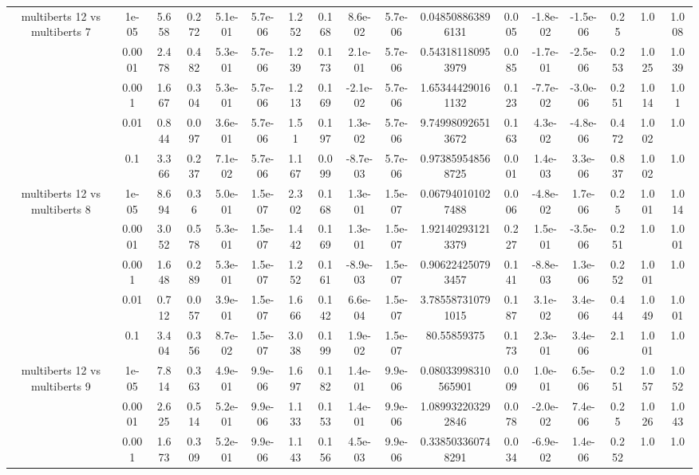 \begin{tabular}{|c|c|c|c|c|c|c|c|c|c|c|c|c|c|c|c|c|}
\hline
\multirow{5}{*}{multiberts 12 vs multiberts 7} & 1e-05 & 5.658 & 0.272 & 5.1e-01 & 5.7e-06 & 1.252 & 0.168 & 8.6e-02 & 5.7e-06 & 0.048508863896131 & 0.005 & -1.8e-02 & -1.5e-06 & 0.25 & 1.0 & 1.008 \\
 & 0.0001 & 2.478 & 0.482 & 5.3e-01 & 5.7e-06 & 1.239 & 0.173 & 2.1e-01 & 5.7e-06 & 0.543181180953979 & 0.085 & -1.7e-01 & -2.5e-06 & 0.253 & 1.025 & 1.039 \\
 & 0.001 & 1.667 & 0.304 & 5.3e-01 & 5.7e-06 & 1.213 & 0.169 & -2.1e-02 & 5.7e-06 & 1.653444290161132 & 0.123 & -7.7e-02 & -3.0e-06 & 0.251 & 1.014 & 1.01 \\
 & 0.01 & 0.844 & 0.097 & 3.6e-01 & 5.7e-06 & 1.51 & 0.197 & 1.3e-02 & 5.7e-06 & 9.749980926513672 & 0.163 & 4.3e-02 & -4.8e-06 & 0.472 & 1.002 & 1.0 \\
 & 0.1 & 3.366 & 0.237 & 7.1e-02 & 5.7e-06 & 1.167 & 0.099 & -8.7e-03 & 5.7e-06 & 0.973859548568725 & 0.001 & 1.4e-03 & 3.3e-06 & 0.837 & 1.002 & 1.0 \\
\hline
\multirow{5}{*}{multiberts 12 vs multiberts 8} & 1e-05 & 8.694 & 0.36 & 5.0e-01 & 1.5e-07 & 2.302 & 0.168 & 1.3e-01 & 1.5e-07 & 0.067940101027488 & 0.006 & -4.8e-02 & 1.7e-06 & 0.25 & 1.001 & 1.014 \\
 & 0.0001 & 3.052 & 0.578 & 5.3e-01 & 1.5e-07 & 1.442 & 0.169 & 1.3e-01 & 1.5e-07 & 1.921402931213379 & 0.227 & 1.5e-01 & -3.5e-06 & 0.251 & 1.0 & 1.001 \\
 & 0.001 & 1.648 & 0.289 & 5.3e-01 & 1.5e-07 & 1.252 & 0.161 & -8.9e-03 & 1.5e-07 & 0.906224250793457 & 0.141 & -8.8e-03 & 1.3e-06 & 0.252 & 1.001 & 1.0 \\
 & 0.01 & 0.712 & 0.057 & 3.9e-01 & 1.5e-07 & 1.666 & 0.142 & 6.6e-04 & 1.5e-07 & 3.785587310791015 & 0.187 & 3.1e-02 & 3.4e-06 & 0.444 & 1.049 & 1.001 \\
 & 0.1 & 3.404 & 0.356 & 8.7e-02 & 1.5e-07 & 3.038 & 0.199 & 1.9e-02 & 1.5e-07 & 80.55859375 & 0.173 & 2.3e-01 & 3.4e-06 & 2.1 & 1.001 & 1.0 \\
\hline
\multirow{5}{*}{multiberts 12 vs multiberts 9} & 1e-05 & 7.814 & 0.363 & 4.9e-01 & 9.9e-06 & 1.697 & 0.182 & 1.4e-01 & 9.9e-06 & 0.08033998310565901 & 0.009 & 1.0e-01 & 6.5e-06 & 0.251 & 1.057 & 1.052 \\
 & 0.0001 & 2.625 & 0.514 & 5.2e-01 & 9.9e-06 & 1.133 & 0.153 & 1.4e-01 & 9.9e-06 & 1.089932203292846 & 0.078 & -2.0e-02 & 7.4e-06 & 0.25 & 1.026 & 1.043 \\
 & 0.001 & 1.673 & 0.309 & 5.2e-01 & 9.9e-06 & 1.143 & 0.156 & 4.5e-03 & 9.9e-06 & 0.338503360748291 & 0.034 & -6.9e-02 & 1.4e-06 & 0.252 & 1.0 & 1.0 \\

\end{tabular}
